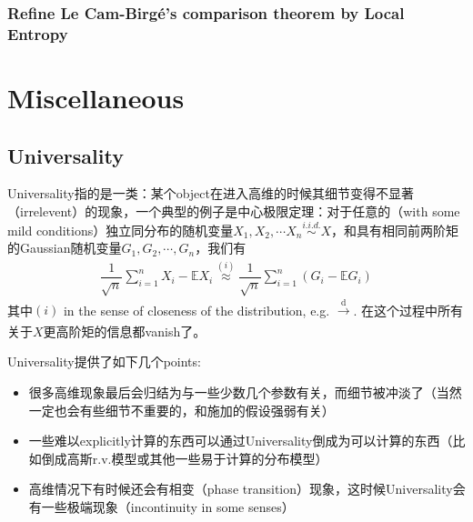 \documentclass[11pt,a4paper]{ctexart}
\numberwithin{equation}{section}%
\begin{document}
    


\subsubsection{Refine Le Cam-Birg\'e's comparison theorem by Local Entropy}
















    






\section{Miscellaneous}

\subsection{Universality}

Universality指的是一类：某个object在进入高维的时候其细节变得不显著（irrelevent）的现象，一个典型的例子是中心极限定理：对于任意的（with some mild conditions）独立同分布的随机变量$ X_1,X_2,\cdots X_n \mathop{ \sim  }\limits^{i.i.d.} X$，和具有相同前两阶矩的Gaussian随机变量$ G_1,G_2,\cdots,G_n $，我们有
\begin{align*}
    \dfrac{ 1 }{ \sqrt{n} }\sum_{i=1}^n X_i-\mathbb{E}X_i \mathop{ \approx  }\limits^{(i)} \dfrac{ 1 }{ \sqrt{n} }\sum_{i=1}^n (G_i-\mathbb{E}G_i)
\end{align*}
其中$ (i) $ in the sense of closeness of the distribution, e.g. $ \xrightarrow[]{\mathrm{d}}  $. 在这个过程中所有关于$ X $更高阶矩的信息都vanish了。

Universality提供了如下几个points:
\begin{itemize}[topsep=2pt,itemsep=0pt]
    \item 很多高维现象最后会归结为与一些少数几个参数有关，而细节被冲淡了（当然一定也会有些细节不重要的，和施加的假设强弱有关）
    \item 一些难以explicitly计算的东西可以通过Universality倒成为可以计算的东西（比如倒成高斯r.v.模型或其他一些易于计算的分布模型）
    \item 高维情况下有时候还会有相变（phase transition）现象，这时候Universality会有一些极端现象（incontinuity in some senses）
\end{itemize}

    















    

    
\end{document}
